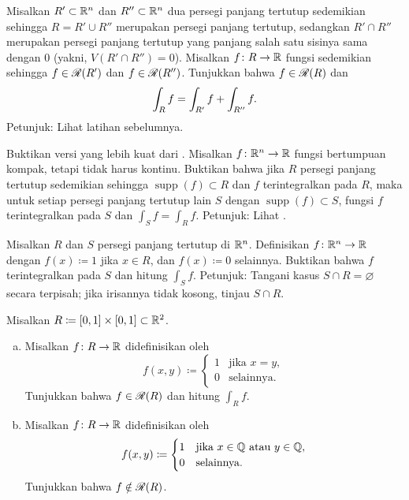 \begin{exercise}
Misalkan $R' \subset {\mathbb{R}}^n$ dan $R'' \subset {\mathbb{R}}^n$ dua persegi panjang tertutup
sedemikian sehingga $R = R' \cup R''$ merupakan persegi panjang tertutup,
sedangkan $R' \cap R''$ merupakan persegi panjang tertutup yang panjang salah
satu sisinya sama dengan 0
(yakni, $V(R' \cap R'') = 0$). Misalkan $f \colon R \to {\mathbb{R}}$ fungsi sedemikian
sehingga $f \in {\mathscr{R}}(R')$ dan $f \in {\mathscr{R}}(R'')$. Tunjukkan bahwa
$f \in {\mathscr{R}}(R)$ dan
\begin{equation*}
\int_{R} f = \int_{R'} f + \int_{R''} f .
\avoidbreak
\end{equation*}
Petunjuk: Lihat latihan sebelumnya.
\end{exercise}

\begin{exercise}
Buktikan versi yang lebih kuat dari .
Misalkan $f \colon {\mathbb{R}}^n \to {\mathbb{R}}$ fungsi bertumpuan kompak, tetapi tidak harus
kontinu. Buktikan bahwa jika $R$ persegi panjang tertutup sedemikian sehingga
$\operatorname{supp}(f) \subset R$ dan $f$ terintegralkan pada $R$, maka untuk
setiap persegi panjang tertutup lain $S$ dengan
$\operatorname{supp}(f) \subset S$, fungsi $f$ terintegralkan pada $S$ dan
$\int_S f = \int_R f$.
Petunjuk: Lihat .
\end{exercise}

\begin{exercise}
Misalkan $R$ dan $S$ persegi panjang tertutup di ${\mathbb{R}}^n$. Definisikan
$f \colon {\mathbb{R}}^n \to {\mathbb{R}}$ dengan $f(x) \coloneqq 1$ jika $x \in R$, dan
$f(x) \coloneqq 0$ selainnya. Buktikan bahwa $f$ terintegralkan pada $S$ dan
hitung $\int_S f$. Petunjuk: Tangani kasus $S \cap R = \varnothing$ secara
terpisah; jika irisannya tidak kosong, tinjau $S \cap R$.
\end{exercise}

\begin{samepage}
\begin{exercise}
Misalkan $R \coloneqq [0,1] \times [0,1] \subset {\mathbb{R}}^2$.
\begin{enumerate}[a)]
\item
Misalkan $f \colon R \to {\mathbb{R}}$ didefinisikan oleh
\begin{equation*}
f(x,y) \coloneqq 
\begin{cases}
1 & \text{jika } x = y, \\
0 & \text{selainnya.}
\end{cases}
\end{equation*}
Tunjukkan bahwa $f \in {\mathscr{R}}(R)$ dan hitung $\int_R f$.
\item
Misalkan $f \colon R \to {\mathbb{R}}$ didefinisikan oleh
\begin{equation*}
f(x,y) \coloneqq 
\begin{cases}
1 & \text{jika } x \in {\mathbb{Q}} \text{ atau } y \in {\mathbb{Q}}, \\
0 & \text{selainnya.}
\end{cases}
\end{equation*}
Tunjukkan bahwa $f \notin {\mathscr{R}}(R)$.
\end{enumerate}
\end{exercise}
\end{samepage}

